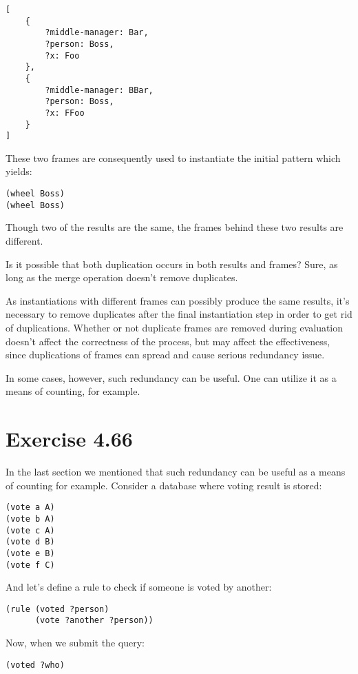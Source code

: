 \documentclass[../main.tex]{subfiles}
\begin{document}
\begin{lstlisting}
[
	{
		?middle-manager: Bar,
		?person: Boss,
		?x: Foo
	},
	{
		?middle-manager: BBar,
		?person: Boss,
		?x: FFoo
	}
]
\end{lstlisting}

These two frames are consequently used to instantiate the initial pattern which yields:

\begin{lstlisting}
(wheel Boss)
(wheel Boss)
\end{lstlisting}

Though two of the results are the same, the frames behind these two results are different.

Is it possible that both duplication occurs in both results and frames? Sure, as long as the merge operation doesn't  remove duplicates.

As instantiations with different frames can possibly produce the same results, it's necessary to remove duplicates after the final instantiation step in order to get rid of duplications. Whether or not duplicate frames are removed during evaluation doesn't affect the correctness of the process, but may affect the effectiveness, since duplications of frames can spread and cause serious redundancy issue.

In some cases, however, such redundancy can be useful. One can utilize it as a means of counting, for example.

\section{Exercise 4.66}

In the last section we mentioned that such redundancy can be useful as a means of counting for example. Consider a database where voting result is stored:

\begin{lstlisting}
(vote a A)
(vote b A)
(vote c A)
(vote d B)
(vote e B)
(vote f C)
\end{lstlisting}

And let's define a rule to check if someone is voted by another:

\begin{lstlisting}
(rule (voted ?person)
      (vote ?another ?person))
\end{lstlisting}

Now, when we submit the query:

\begin{lstlisting}
(voted ?who)
\end{lstlisting}
\end{document}
